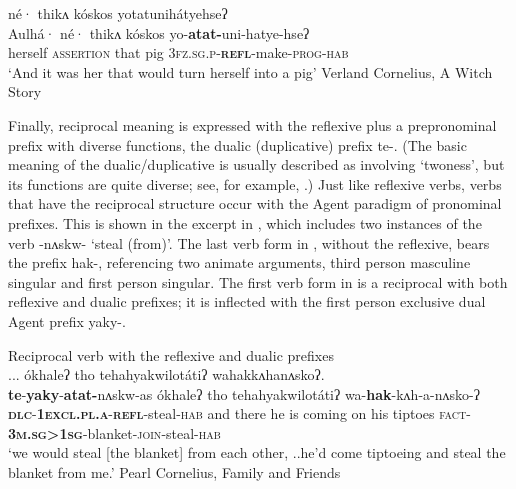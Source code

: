 \documentclass[output=paper]{langscibook}
\begin{document}
  \ex  \label{ex:oneida:15d}
    {né·} {thikʌ}  {kóskos}  {yotatunihátyehseʔ}\\
   Aulhá· né· thikʌ kóskos yo-\textbf{atat-}uni-hatye-hseʔ\\
   herself \textsc{assertion} that  pig \textsc{3fz.sg.p-}\textbf{\textsc{refl}}\textsc{-}make\textsc{-prog-hab}  \\
  \glt ‘And it was her that would turn herself into a pig’ Verland Cornelius, {A} {Witch} {Story}
  \z 
 \z

Finally, reciprocal meaning is expressed with the reflexive plus a prepronominal prefix with diverse functions, the dualic (duplicative) prefix {te-}. (The basic meaning of the dualic/duplicative is usually described as involving ‘twoness’, but its functions are quite diverse; see, for example, \citealt{Lounsbury1953}.) Just like reflexive verbs, verbs that have the reciprocal structure occur with the Agent paradigm of pronominal prefixes. This is shown in the excerpt in , which includes two instances of the verb {-nʌskw-} ‘steal (from)’. The last verb form in , without the reflexive, bears the prefix {hak-}, referencing two animate arguments, third person masculine singular and first person singular. The first verb form in  is a reciprocal with both reflexive and dualic prefixes; it is inflected with the first person exclusive dual Agent prefix {yaky-}.

\ea%
    \label{ex:oneida:16}
    Reciprocal verb with the reflexive and dualic prefixes\\
    ... {ókhaleʔ}  {tho} {tehahyakwilotátiʔ} {wahakkʌhanʌskoʔ.} \\
    \textbf{te}-\textbf{yaky}-\textbf{atat-}nʌskw-as {ókhaleʔ}  {tho} {tehahyakwilotátiʔ} wa-\textbf{hak}{}-kʌh-a-nʌsko-ʔ\\
  \textbf{\textsc{dlc}}\textsc{-}\textbf{\textsc{1excl.pl.a}}\textsc{-}\textbf{\textsc{refl}}\textsc{-}steal\textsc{-hab}  and    there  he is coming on his tiptoes \textsc{fact-}\textbf{\textsc{3m.sg>1sg}}\textsc{-}blanket-\textsc{join}{}-steal\textsc{-hab}\\
   \glt ‘we would steal [the blanket] from each other, ..he'd come tiptoeing and steal the blanket from me.’ Pearl Cornelius, {Family} {and} {Friends}
  \z
\end{document}
